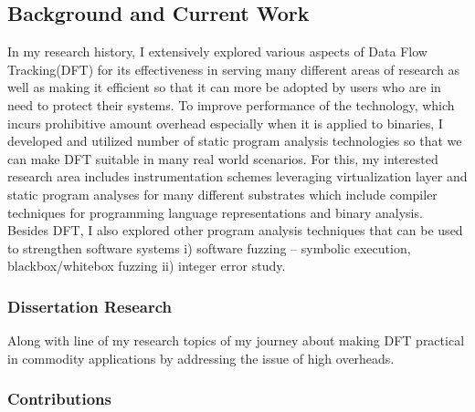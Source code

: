 \documentclass[letterpaper, 10pt]{article}
\begin{document}
\begin{small}
\subsection*{Background and Current Work}
%
In my research history, I extensively explored various aspects of Data Flow
Tracking(DFT) for its effectiveness in serving many different areas of research
as well as making it efficient so that it can more be adopted by users who are
in need to protect their systems.
%
To improve  performance of the technology, which incurs prohibitive amount
overhead especially when it is applied to binaries, I developed and utilized
number of static program analysis technologies so that we can make DFT suitable
in many real world scenarios.
%
For this, my interested research area includes instrumentation schemes
leveraging virtualization layer and static program analyses for many different
substrates which include compiler techniques for programming language
representations and binary analysis.
%
Besides DFT, I also explored other program analysis techniques that can be used
to strengthen software systems i) software fuzzing -- symbolic execution,
blackbox/whitebox fuzzing ii) integer error study.


\subsubsection*{Dissertation Research}
Along with line of my research topics of my journey about making DFT practical
in commodity applications by addressing the issue of high overheads.


\subsubsection*{Contributions}


\end{small}
\end{document}
